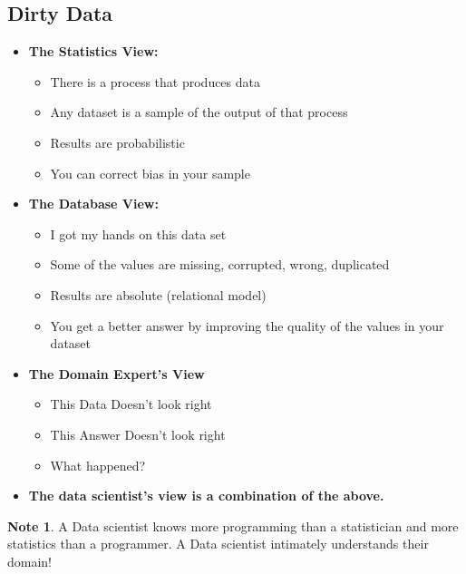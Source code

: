 \documentclass[11pt]{article}
\theoremstyle{definition}
\newtheorem{note}{Note}
\begin{document}
\subsection{Dirty Data}
\begin{itemize}
    \item \textbf{The Statistics View:}
    \begin{itemize}
        \item There is a process that produces data
        \item Any dataset is a sample of the output of that process
        \item Results are probabilistic
        \item You can correct bias in your sample
    \end{itemize}
    \item \textbf{The Database View:}
    \begin{itemize}
        \item I got my hands on this data set
        \item Some of the values are missing, corrupted, wrong, duplicated
        \item Results are absolute (relational model)
        \item You get a better answer by improving the quality of the values in your dataset
    \end{itemize}
    \item \textbf{The Domain Expert’s View}
    \begin{itemize}
        \item This Data Doesn’t look right
        \item This Answer Doesn’t look right
        \item What happened?
    \end{itemize}
    \item \textbf{The data scientist's view is a combination of the above.}
\end{itemize}
\begin{note}
    A Data scientist knows more programming than a statistician
    and more statistics than a programmer.
    A Data scientist intimately understands their domain!
\end{note}
\end{document}
